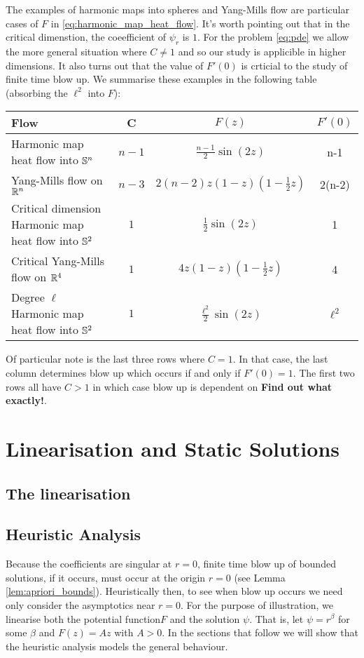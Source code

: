 \documentclass{amsart}
\begin{document}
The examples of harmonic maps into spheres and Yang-Mills flow are particular cases of \(F\) in \eqref{eq:harmonic_map_heat_flow}. It's worth pointing out that in the critical dimenstion, the coeefficient of \(\psi_r\) is \(1\). For the problem \eqref{eq:pde} we allow the more general situation where \(C \ne 1\) and so our study is applicible in higher dimensions. It also turns out that the value of \(F'(0)\) is crticial to the study of finite time blow up. We summarise these examples in the following table (absorbing the \(\ell^2\) into \(F\)):

\begin{center}
\begin{tabular}{ l | c | c | c}
Flow & C & \(F(z)\) & \(F'(0)\) \\
\hline
Harmonic map heat flow into \(\S^n\) & \(n-1\) & \(\tfrac{n-1}{2} \sin(2z)\) & n-1 \\
Yang-Mills flow on \(\R^n\) & \(n-3\) & \(2(n-2) z(1 - z)(1 - \tfrac{1}{2} z)\) & 2(n-2) \\
Critical dimension Harmonic map heat flow into \(\S^2\) & \(1\) & \(\tfrac{1}{2} \sin(2z)\) & 1 \\
Critical Yang-Mills flow on \(\R^4\) & \(1\) & \(4 z(1 - z)(1 - \tfrac{1}{2} z)\) & 4 \\
Degree \(\ell\) Harmonic map heat flow into \(\S^2\) & \(1\) & \(\tfrac{\ell^2}{2} \sin(2z)\) & \(\ell^2\)
\end{tabular}
\end{center}

Of particular note is the last three rows where \(C = 1\). In that case, the last column determines blow up which occurs if and only if \(F'(0) = 1\). The first two rows all have \(C > 1\) in which case blow up is dependent on \textbf{Find out what exactly!}.


\section{Linearisation and Static Solutions}

\subsection{The linearisation}

\subsection{Heuristic Analysis}

Because the coefficients are singular at \(r=0\), finite time blow up of bounded solutions, if it occurs, must occur at the origin \(r = 0\) (see Lemma \ref{lem:apriori_bounds}). Heuristically then, to see when blow up occurs we need only consider the asymptotics near \(r = 0\). For the purpose of illustration, we linearise both the potential function\(F\) and the solution \(\psi\). That is, let \(\psi = r^{\beta}\) for some \(\beta\) and \(F(z) = A z\) with \(A > 0\). In the sections that follow we will show that the heuristic analysis models the general behaviour.
\end{document}
